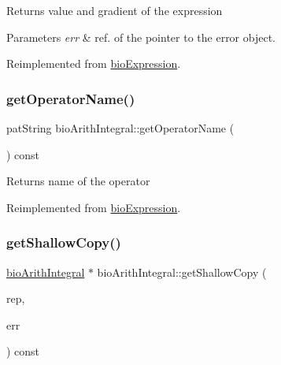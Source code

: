\begin{DoxyReturn}{Returns}
value and gradient of the expression 
\end{DoxyReturn}

\begin{DoxyParams}{Parameters}
{\em err} & ref. of the pointer to the error object. \\
\hline
\end{DoxyParams}


Reimplemented from \hyperlink{classbio_expression_a91c81ce80c9e972c913b10f5f3c1ed13}{bio\+Expression}.

\mbox{\label{classbio_arith_integral_abae8e14e091ddc4e7281ec5ba36f8cf8}} 
\subsubsection{\texorpdfstring{get\+Operator\+Name()}{getOperatorName()}}
{\footnotesize\ttfamily pat\+String bio\+Arith\+Integral\+::get\+Operator\+Name (\begin{DoxyParamCaption}{ }\end{DoxyParamCaption}) const\hspace{0.3cm}{\ttfamily [virtual]}}

\begin{DoxyReturn}{Returns}
name of the operator 
\end{DoxyReturn}


Reimplemented from \hyperlink{classbio_expression_a2353a4afb3a2b0af7c63aba086a72bde}{bio\+Expression}.

\mbox{\label{classbio_arith_integral_a0a9619e66e582266bf1975d59b7c2bec}} 
\subsubsection{\texorpdfstring{get\+Shallow\+Copy()}{getShallowCopy()}}
{\footnotesize\ttfamily \hyperlink{classbio_arith_integral}{bio\+Arith\+Integral} $\ast$ bio\+Arith\+Integral\+::get\+Shallow\+Copy (\begin{DoxyParamCaption}\item[{\hyperlink{classbio_expression_repository}{bio\+Expression\+Repository} $\ast$}]{rep,  }\item[{pat\+Error $\ast$\&}]{err }\end{DoxyParamCaption}) const\hspace{0.3cm}{\ttfamily [virtual]}}

